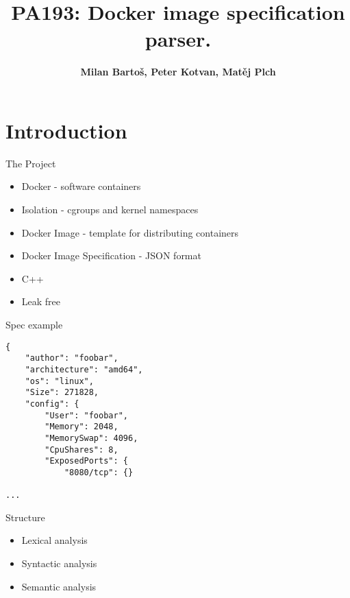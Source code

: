 \documentclass{beamer}
\title[Docker Img Spec Parser]{PA193: Docker image specification parser.} %
\author{\textbf{Milan Bartoš, Peter Kotvan, Matěj Plch}}
\institute[FI MUNI] %
{
FI MUNI \\ %
\medskip
}
\begin{document}
\begin{frame}
\titlepage %
\end{frame}


\section{Introduction}

\begin{frame}[fragile]{The Project}

\begin{itemize}
    \item Docker - software containers
    \item Isolation - cgroups and kernel namespaces
    \item Docker Image - template for distributing containers
    \item Docker Image Specification - JSON format
    \item C++
    \item Leak free
\end{itemize}

\end{frame}

\begin{frame}[fragile]{Spec example}
\begin{verbatim}
{
    "author": "foobar",
    "architecture": "amd64",
    "os": "linux",
    "Size": 271828,
    "config": {
        "User": "foobar",
        "Memory": 2048,
        "MemorySwap": 4096,
        "CpuShares": 8,
        "ExposedPorts": {
            "8080/tcp": {}

...
\end{verbatim}
\end{frame}

\begin{frame}{Structure}

\begin{itemize}
    \item Lexical analysis
    \item Syntactic analysis
    \item Semantic analysis
\end{itemize}
\end{frame}
\end{document}
